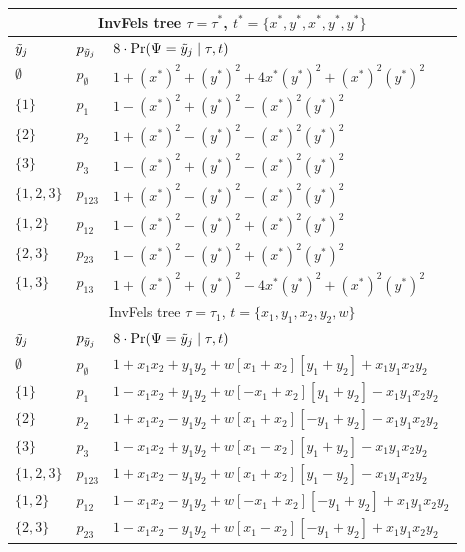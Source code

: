 \begin{table}[ht]
\centering
\begin{tabular}{|l|l|l|}
    \multicolumn{3}{c}{InvFels tree $\tau=\tau^*$, $t^*=\{x^*,y^*,x^*,y^*,y^*\}$}\\
    \hline
$\tilde{y}_j$  & $p_{\tilde{y}_j}$ &$8\cdot\Pr(\Psi=\tilde{y}_j \mid \tau,t)$\\
    \hline
    $\emptyset$ & $p_{\emptyset}$   &$1+(x^*)^2+(y^*)^2+4x^*(y^*)^2+(x^*)^2(y^*)^2$\\
    $\{1\}$     & $p_{1}$           &$1-(x^*)^2+(y^*)^2-(x^*)^2(y^*)^2$\\
    $\{2\}$     & $p_{2}$           &$1+(x^*)^2-(y^*)^2-(x^*)^2(y^*)^2$\\
    $\{3\}$     & $p_{3}$           &$1-(x^*)^2+(y^*)^2-(x^*)^2(y^*)^2$\\
    $\{1,2,3\}$ & $p_{123}$         &$1+(x^*)^2-(y^*)^2-(x^*)^2(y^*)^2$\\
    $\{1,2\}$   & $p_{12}$          &$1-(x^*)^2-(y^*)^2+(x^*)^2(y^*)^2$\\
    $\{2,3\}$   & $p_{23}$          &$1-(x^*)^2-(y^*)^2+(x^*)^2(y^*)^2$\\
    $\{1,3\}$   & $p_{13}$          &$1+(x^*)^2+(y^*)^2-4x^*(y^*)^2+(x^*)^2(y^*)^2$\\
    \hline
    \multicolumn{3}{c}{InvFels tree $\tau=\tau_1$, $t=\{x_1,y_1,x_2,y_2,w\}$}\\
    \hline
$\tilde{y}_j$  & $p_{\tilde{y}_j}$ &$8\cdot\Pr(\Psi=\tilde{y}_j \mid \tau,t)$\\
    \hline
    $\emptyset$ & $p_{\emptyset}$   &$1 + x_1x_2 +  y_1y_2 +  w[  x_1 + x_2][  y_1 + y_2] + x_1y_1x_2y_2$\\
    $\{1\}$     & $p_{1}$           &$1 - x_1x_2 +  y_1y_2 +  w[- x_1 + x_2][  y_1 + y_2] - x_1y_1x_2y_2$\\
    $\{2\}$     & $p_{2}$           &$1 + x_1x_2 -  y_1y_2 +  w[  x_1 + x_2][- y_1 + y_2] - x_1y_1x_2y_2$\\
    $\{3\}$     & $p_{3}$           &$1 - x_1x_2 +  y_1y_2 +  w[  x_1 - x_2][  y_1 + y_2] - x_1y_1x_2y_2$\\
    $\{1,2,3\}$ & $p_{123}$         &$1 + x_1x_2 -  y_1y_2 +  w[  x_1 + x_2][  y_1 - y_2] - x_1y_1x_2y_2$\\
    $\{1,2\}$   & $p_{12}$          &$1 - x_1x_2 -  y_1y_2 +  w[- x_1 + x_2][- y_1 + y_2] + x_1y_1x_2y_2$\\
    $\{2,3\}$   & $p_{23}$          &$1 - x_1x_2 -  y_1y_2 +  w[  x_1 - x_2][- y_1 + y_2] + x_1y_1x_2y_2$\\

\end{tabular}
\end{table}
